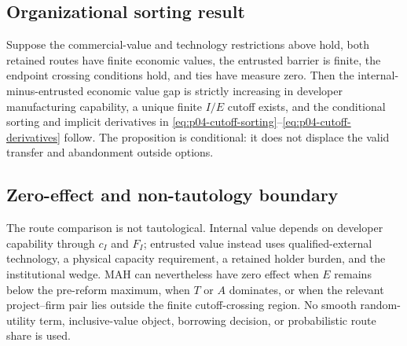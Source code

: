 \subsection{Organizational sorting result}
\label{subsec:p04-sorting-proposition}

Suppose the commercial-value and technology restrictions above hold, both
retained routes have finite economic values, the entrusted barrier is finite,
the endpoint crossing conditions hold, and
ties have measure zero. Then the internal-minus-entrusted economic value gap
is strictly increasing in developer manufacturing capability, a unique finite
\(I/E\) cutoff exists, and the conditional sorting and implicit derivatives in
\eqref{eq:p04-cutoff-sorting}--\eqref{eq:p04-cutoff-derivatives} follow.
The proposition is conditional: it does not displace the valid transfer and
abandonment outside options.

\subsection{Zero-effect and non-tautology boundary}
\label{subsec:p04-zero-effect}

The route comparison is not tautological. Internal value depends on developer
capability through \(c_I\) and \(F_I\); entrusted value instead uses
qualified-external technology, a physical capacity requirement, a retained
holder burden, and the institutional wedge. MAH can nevertheless have zero
effect when \(E\) remains below the pre-reform maximum, when \(T\) or \(A\)
dominates, or when the relevant project--firm pair lies outside the finite
cutoff-crossing region. No smooth random-utility term, inclusive-value object,
borrowing decision, or probabilistic route share is used.
